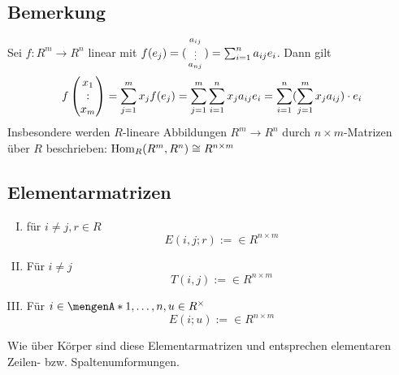 \subsection{Bemerkung} %
\label{sub:1419}
Sei $f : R^m  \to R^n$ linear mit $f(e_j) = (\begin{smallmatrix}
	a_{ij} \\ \vdots \\ a_{nj}
\end{smallmatrix}) = \sum_{i=1}^{n} a_{ij} e_i$. Dann gilt 
\[
	f \begin{pmatrix}
		x_1 \\ : \\ x_m
	\end{pmatrix} = \sum_{j=1}^{m} x_j f(e_j) = \sum_{j=1}^{m} \sum_{i=1}^{n} x_j a_{ij} e_i = \sum_{i=1}^{n}  (\sum_{j=1}^{m} x_j a_{ij} ) \cdot e_i 
\]
Insbesondere werden $R$-lineare Abbildungen $R^m \to R^n$ durch $n \times m$-Matrizen über $R$ beschrieben: $\operatorname{Hom}_R(R^m, R^n) \cong R^{n \times m}$

\subsection{Elementarmatrizen} %
\label{sub:1420}
\begin{enumerate}[I)]
	\item für $i \not= j, r \in R$ 
	\[
		E(i,j;r) := \in R^{n \times m}
	\]
	\item Für $i\not= j$
	\[
		T(i,j) := \in R^{n \times m}
	\]
	\item Für $i \in \set{1, \ldots , n}, u \in R^\times $
	\[
		E(i;u) := \in R^{n \times m}
	\]
\end{enumerate}
Wie über Körper sind diese Elementarmatrizen  und entsprechen elementaren Zeilen- bzw. Spaltenumformungen. 

